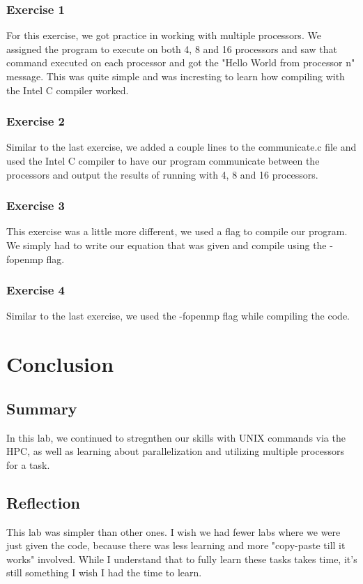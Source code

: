 \documentclass{report}
\begin{document}
\subsection{Exercise 1}
For this exercise, we got practice in working with multiple processors. We assigned the program to execute on both 4, 8 and 16 processors and saw that command executed on each processor and got the "Hello World from processor n" message. This was quite simple and was incresting to learn how compiling with the Intel C compiler worked.


\subsection{Exercise 2}
Similar to the last exercise, we added a couple lines to the communicate.c file and used the Intel C compiler to have our program communicate between the processors and output the results of running with 4, 8 and 16 processors.


\subsection{Exercise 3}
This exercise was a little more different, we used a flag to compile our program. We simply had to write our equation that was given and compile using the -fopenmp flag.


\subsection{Exercise 4}
Similar to the last exercise, we used the -fopenmp flag while compiling the code.


\chapter{Conclusion}
\section{Summary}
In this lab, we continued to stregnthen our skills with UNIX commands via the HPC, as well as learning about parallelization and utilizing multiple processors for a task.

\section{Reflection}
This lab was simpler than other ones. I wish we had fewer labs where we were just given the code, because there was less learning and more "copy-paste till it works" involved. While I understand that to fully learn these tasks takes time, it's still something I wish I had the time to learn.
\end{document}
